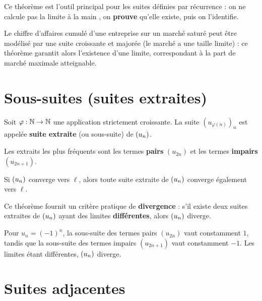 \documentclass[12pt,a4paper]{article}
\begin{document}
Ce théorème est l'outil principal pour les suites définies par récurrence : on ne calcule pas la limite \og à la main \fg{}, on \textbf{prouve} qu'elle existe, puis on l'identifie.

\begin{gestionbox}
Le chiffre d'affaires cumulé d'une entreprise sur un marché saturé peut être modélisé par une suite croissante et majorée (le marché a une taille limite) : ce théorème garantit alors l'existence d'une limite, correspondant à la part de marché maximale atteignable.
\end{gestionbox}

\section{Sous-suites (suites extraites)}

\begin{definitionbox}
Soit $\varphi : \mathbb{N} \to \mathbb{N}$ une application strictement croissante. La suite $(u_{\varphi(n)})_n$ est appelée \textbf{suite extraite} (ou sous-suite) de $(u_n)$.
\end{definitionbox}

Les extraits les plus fréquents sont les termes \textbf{pairs} $(u_{2n})$ et les termes \textbf{impairs} $(u_{2n+1})$.

\begin{theoremebox}[7.1]
Si $(u_n)$ converge vers $\ell$, alors toute suite extraite de $(u_n)$ converge également vers $\ell$.
\end{theoremebox}

\begin{remarquebox}
Ce théorème fournit un critère pratique de \textbf{divergence} : s'il existe deux suites extraites de $(u_n)$ ayant des limites \textbf{différentes}, alors $(u_n)$ diverge.
\end{remarquebox}

\begin{exemplebox}[7.1]
Pour $u_n = (-1)^n$, la sous-suite des termes pairs $(u_{2n})$ vaut constamment $1$, tandis que la sous-suite des termes impairs $(u_{2n+1})$ vaut constamment $-1$. Les limites étant différentes, $(u_n)$ diverge.
\end{exemplebox}

\section{Suites adjacentes}
\end{document}
